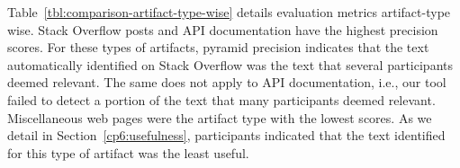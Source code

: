 



Table~\ref{tbl:comparison-artifact-type-wise} details evaluation metrics artifact-type wise. 
Stack Overflow posts and API documentation have the highest precision scores. For these types of artifacts, pyramid precision indicates that the 
text automatically identified on Stack Overflow was the text that several participants deemed relevant. 
The same does not apply to API documentation, i.e., our tool failed to detect a portion of the text that many participants deemed relevant. 
Miscellaneous web pages were the artifact type with the lowest scores. As we detail in Section~\ref{cp6:usefulness},
participants indicated that the text identified for this type of artifact was the least useful.











